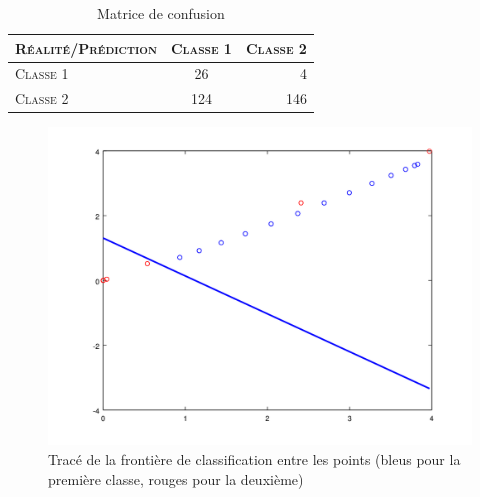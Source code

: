 \documentclass{article}
\begin{document}
     \begin{table}[H]
       \caption{Matrice de confusion}
       \begin{tabular}{|l|c|r|}
         \hline
         \textsc{Réalité/Prédiction} & \textsc{Classe 1} & \textsc{Classe 2}\\
         \hline
         \textsc{Classe 1} & 26 & 4\\
         \hline
         \textsc{Classe 2} & 124 & 146\\
         \hline
       \end{tabular}
     \end{table}

         \begin{figure}
           \begin{center}
             \subfigure\includegraphics[scale=0.3]{images/line2D5.png}
             \caption{Tracé de la frontière de classification entre les points (bleus pour la première classe, rouges pour la deuxième)}
           \end{center}
         \end{figure}
\end{document}
